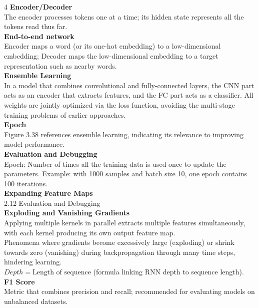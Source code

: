 \documentclass[8pt]{extarticle}
\begin{document}
\begin{multicols}{4}
\vspace{2pt}\textbf{Encoder/Decoder}\\
The encoder processes tokens one at a time; its hidden state represents all the tokens read thus far.\\
\vspace{2pt}\textbf{End-to-end network}\\
Encoder maps a word (or its one-hot embedding) to a low-dimensional embedding; Decoder maps the low-dimensional embedding to a target representation such as nearby words.\\
\vspace{2pt}\textbf{Ensemble Learning}\\
In a model that combines convolutional and fully-connected layers, the CNN part acts as an encoder that extracts features, and the FC part acts as a classifier. All weights are jointly optimized via the loss function, avoiding the multi-stage training problems of earlier approaches.\\
\vspace{2pt}\textbf{Epoch}\\
Figure 3.38 references ensemble learning, indicating its relevance to improving model performance.\\
\vspace{2pt}\textbf{Evaluation and Debugging}\\
Epoch: Number of times all the training data is used once to update the parameters. Example: with 1000 samples and batch size 10, one epoch contains 100 iterations.\\
\vspace{2pt}\textbf{Expanding Feature Maps}\\
2.12 Evaluation and Debugging\\
\vspace{2pt}\textbf{Exploding and Vanishing Gradients}\\
Applying multiple kernels in parallel extracts multiple features simultaneously, with each kernel producing its own output feature map.\\
Phenomena where gradients become excessively large (exploding) or shrink towards zero (vanishing) during backpropagation through many time steps, hindering learning.\\
$Depth = \text{Length of sequence}$ (formula linking RNN depth to sequence length).\\
\vspace{2pt}\textbf{F1 Score}\\
Metric that combines precision and recall; recommended for evaluating models on unbalanced datasets.\\

\end{multicols}
\end{document}
